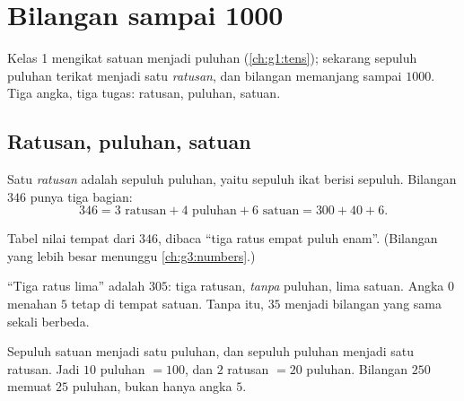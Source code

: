 \chapter{Bilangan sampai 1000}\label{ch:g2:numbers}

Kelas 1 mengikat satuan menjadi puluhan (\cref{ch:g1:tens}); sekarang
sepuluh puluhan terikat menjadi satu \emph{ratusan}, dan bilangan
memanjang sampai $1000$. Tiga angka, tiga tugas: ratusan, puluhan,
satuan.

\section{Ratusan, puluhan, satuan}

\begin{definition}\label{def:g2:numbers:places}
Satu \emph{ratusan} adalah sepuluh puluhan, yaitu sepuluh ikat berisi
sepuluh. Bilangan $346$ punya tiga bagian:
\[
346 = 3 \text{ ratusan} + 4 \text{ puluhan} + 6 \text{ satuan}
= 300 + 40 + 6 .
\]
\end{definition}

\begin{omfigure}

{\small Tabel nilai tempat dari $346$, dibaca ``tiga ratus empat
puluh enam''. (Bilangan yang lebih besar menunggu
\cref{ch:g3:numbers}.)}
\end{omfigure}

\begin{example}\label{ex:g2:numbers:zero}
``Tiga ratus lima'' adalah $305$: tiga ratusan, \emph{tanpa} puluhan,
lima satuan. Angka $0$ menahan $5$ tetap di tempat satuan. Tanpa 
itu, $35$ menjadi bilangan yang sama sekali berbeda.
\end{example}

\begin{example}[Menukar]\label{ex:g2:numbers:exchange}
Sepuluh satuan menjadi satu puluhan, dan sepuluh puluhan menjadi
satu ratusan. Jadi $10$ puluhan $= 100$, dan $2$ ratusan $= 20$ puluhan.
Bilangan $250$ memuat $25$ puluhan, bukan hanya angka $5$.
\end{example}

